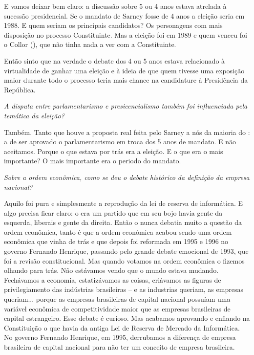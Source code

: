 E vamos deixar bem claro: a discussão sobre 5 ou 4 anos estava atrelada
à sucessão presidencial. Se o mandato de Sarney fosse de 4 anos a
eleição seria em 1988. E quem seriam os principais candidatos? Os
personagens com mais disposição no processo Constituinte. Mas a eleição
foi em 1989 e quem venceu foi o Collor (), que não tinha nada a ver
com a Constituinte.

Então sinto que na verdade o debate dos 4 ou 5 anos estava relacionado à
virtualidade de ganhar uma eleição e à ideia de que quem tivesse uma
exposição maior durante todo o processo teria mais chance na candidature
à Presidência da República.

\medskip

\emph{A disputa entre parlamentarismo e presicencialismo também foi
influenciada pela temática da eleição?}

Também. Tanto que houve a proposta real feita pelo
Sarney a nós da maioria do : a de ser aprovado o parlamentarismo em
troca dos 5 anos de mandato. E não aceitamos. Porque o que estava por
trás era a eleição. E o que era o mais importante? O mais importante era
o periodo do mandato.

\medskip

\emph{Sobre a ordem econômica, como se deu o debate histórico da definição da
empresa nacional?}

Aquilo foi pura e simplesmente a reprodução da lei de
reserva de informática. E algo precisa ficar claro: o  era um
partido que em seu bojo havia gente da esquerda, liberais e gente da
direita. Então o  nunca debatia muito a questão da ordem econômica,
tanto é que a ordem econômica acabou sendo uma ordem econômica que vinha
de trás e que depois foi reformada em 1995 e 1996 no governo Fernando
Henrique, passando pelo grande debate emocional de 1993, que foi a
revisão constitucional. Mas quando votamos na ordem econômica o fizemos
olhando para trás. Não estávamos vendo que o mundo estava mudando.
Fechávamos a economia, estatizávamos as coisas, criávamos as figuras de
privilegiamento das indústrias brasileiras -- e as industrias queriam,
as empresas queriam... porque as empresas brasileiras de capital
nacional possuíam uma variável econômica de competitividade maior que as
empresas brasileiras de capital estrangeiro. Esse debate é curioso. Mas
acabamos aprovando e enfiando na Constituição o que havia da antiga Lei
de Reserva de Mercado da Informática. No governo Fernando Henrique, em
1995, derrubamos a diferença de empresa brasileira de capital nacional
para não ter um conceito de empresa brasileira.

